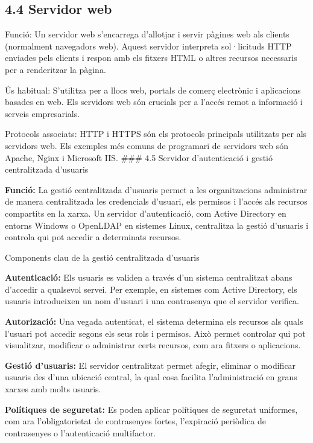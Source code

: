 \documentclass[
  a4paper,
]{article}
\begin{document}
\subsection{4.4 Servidor web}\label{servidor-web}

Funció: Un servidor web s'encarrega d'allotjar i servir pàgines web als
clients (normalment navegadors web). Aquest servidor interpreta
sol·licituds HTTP enviades pels clients i respon amb els fitxers HTML o
altres recursos necessaris per a renderitzar la pàgina.

Ús habitual: S'utilitza per a llocs web, portals de comerç electrònic i
aplicacions basades en web. Els servidors web són crucials per a l'accés
remot a informació i serveis empresarials.

Protocols associats: HTTP i HTTPS són els protocols principals
utilitzats per als servidors web. Els exemples més comuns de programari
de servidors web són Apache, Nginx i Microsoft IIS. \#\#\# 4.5 Servidor
d'autenticació i gestió centralitzada d'usuaris

\textbf{Funció:} La gestió centralitzada d'usuaris permet a les
organitzacions administrar de manera centralitzada les credencials
d'usuari, els permisos i l'accés als recursos compartits en la xarxa. Un
servidor d'autenticació, com Active Directory en entorns Windows o
OpenLDAP en sistemes Linux, centralitza la gestió d'usuaris i controla
qui pot accedir a determinats recursos.

Components clau de la gestió centralitzada d'usuaris

\textbf{Autenticació:} Els usuaris es validen a través d'un sistema
centralitzat abans d'accedir a qualsevol servei. Per exemple, en
sistemes com Active Directory, els usuaris introdueixen un nom d'usuari
i una contrasenya que el servidor verifica.

\textbf{Autorizació:} Una vegada autenticat, el sistema determina els
recursos als quals l'usuari pot accedir segons els seus rols i permisos.
Això permet controlar qui pot visualitzar, modificar o administrar certs
recursos, com ara fitxers o aplicacions.

\textbf{Gestió d'usuaris:} El servidor centralitzat permet afegir,
eliminar o modificar usuaris des d'una ubicació central, la qual cosa
facilita l'administració en grans xarxes amb molts usuaris.

\textbf{Polítiques de seguretat:} Es poden aplicar polítiques de
seguretat uniformes, com ara l'obligatorietat de contrasenyes fortes,
l'expiració periòdica de contrasenyes o l'autenticació multifactor.
\end{document}
